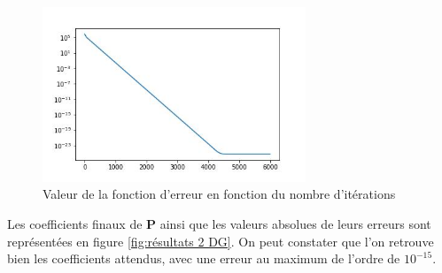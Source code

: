 \documentclass[12pt]{report}
\begin{document}
\begin{figure}
    \centering
    \includegraphics[width=0.7\textwidth]{Erreur_2_DG.jpg}
    \caption{\label{fig:Erreur_2_DG}Valeur de la fonction d'erreur en fonction du nombre d'itérations}
\end{figure}

Les coefficients finaux de $\bm{P}$ ainsi que les valeurs absolues de leurs erreurs sont représentées en figure \ref{fig:résultats 2 DG}.
On peut constater que l'on retrouve bien les coefficients attendus, avec une erreur au maximum de l'ordre de $10^{-15}$.
\end{document}
